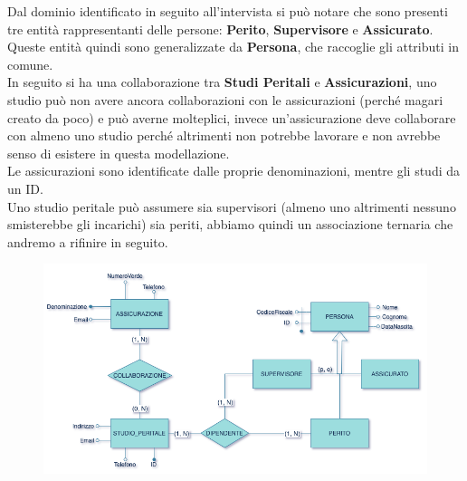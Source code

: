 \documentclass[a4paper,12pt]{report}
\begin{document}
\clearpage

Dal dominio identificato in seguito all’intervista si può notare che sono presenti tre entità rappresentanti delle persone: \textbf{Perito}, \textbf{Supervisore} e \textbf{Assicurato}.
\\
Queste entità quindi sono generalizzate da \textbf{Persona}, che raccoglie gli attributi in comune.
\\
In seguito si ha una collaborazione tra \textbf{Studi Peritali} e \textbf{Assicurazioni}, uno studio può non avere ancora collaborazioni con le assicurazioni (perché magari creato da poco) e può averne molteplici, invece un’assicurazione deve collaborare con almeno uno studio perché altrimenti non potrebbe lavorare e non avrebbe senso di esistere in questa modellazione.
\\
Le assicurazioni sono identificate dalle proprie denominazioni, mentre gli studi da un ID. 
\\
Uno studio peritale può assumere sia supervisori (almeno uno altrimenti nessuno smisterebbe gli incarichi) sia periti, abbiamo quindi un associazione ternaria che andremo a rifinire in seguito.
\\
\begin{figure}[ht]
    \begin{center}
        \centering
        \includegraphics[width=\textwidth]{img/StudioPeritale.png}
    \end{center}
\end{figure}
\clearpage
\end{document}
